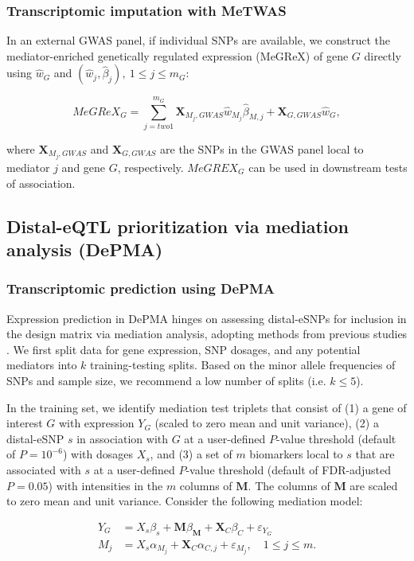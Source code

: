 \subsubsection{Transcriptomic imputation with MeTWAS}
In an external GWAS panel, if individual SNPs are 
available, we construct the mediator-enriched genetically regulated
expression (MeGReX) of gene $G$
directly using $\hat{w}_G$ and $(\hat{w}_j,\hat{\beta}_j),~1 \leq j \leq m_G$:

$$MeGReX_G = \sum_{j =two 1}^{m_G}{\mathbf{X}_{M_j,GWAS}\hat{w}_{M_j}\hat{\beta}_{M,j}} + 
\mathbf{X}_{G,GWAS}\hat{w}_G,$$

\noindent where $\mathbf{X}_{M_j,GWAS}$ and $\mathbf{X}_{G,GWAS}$ 
are the SNPs in the GWAS
panel local to mediator $j$ and gene $G$, respectively.
$MeGREX_G$ can be used in downstream tests of association. 


\subsection{Distal-eQTL prioritization via mediation analysis (DePMA)}

\subsubsection{Transcriptomic prediction using DePMA}

Expression prediction in DePMA hinges on
assessing distal-eSNPs for inclusion in the design matrix
via mediation analysis, adopting
methods from previous studies \cite{Pierce2014,Shan2019,Yang2017}. 
We first split data for
gene expression, SNP dosages, and any potential mediators
into $k$ training-testing splits. Based on the 
minor allele frequencies of SNPs and sample size,
we recommend a low number of splits (i.e. $k \leq 5$).

In the training set, we identify mediation test triplets
that consist of (1) a gene of interest $G$
with expression $Y_G$ (scaled to zero mean
and unit variance), (2)
a distal-eSNP $s$ in association
with $G$ at a user-defined $P$-value
threshold (default of $P = 10^{-6}$)
with dosages $X_s$, and (3)
a set of $m$ biomarkers local 
to $s$ that are associated
with $s$ at a user-defined $P$-value threshold
(default of FDR-adjusted $P = 0.05$)
with intensities in the $m$ columns of 
$\mathbf{M}$. The columns of $\mathbf{M}$
are scaled to zero mean and unit variance.
Consider the following
mediation model:

\begin{equation}\label{mediation}
\begin{split}
Y_G & = X_s\beta_s + \mathbf{M}\beta_{\mathbf{M}} + \mathbf{X}_C\beta_{C} + \varepsilon_{Y_G} \\
M_j & = X_s\alpha_{M_j} + \mathbf{X}_C\alpha_{C,j} + \varepsilon_{M_j}, \quad 1 \leq j \leq m.
\end{split}
\end{equation}

